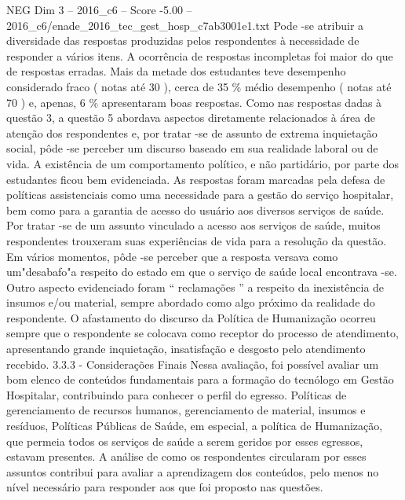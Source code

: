 \begin{textsample}{NEG Dim 3 – 2016\_c6 – Score -5.00 – 2016\_c6/enade\_2016\_tec\_gest\_hosp\_c7ab3001e1.txt}
Pode -se atribuir a diversidade das respostas produzidas pelos respondentes à necessidade de responder a vários itens.
A ocorrência de respostas incompletas foi maior do que de respostas erradas.
Mais da metade dos estudantes teve desempenho considerado fraco ( notas até 30 ), cerca de 35 \% médio desempenho ( notas até 70 ) e, apenas, 6 \% apresentaram boas respostas.
Como nas respostas dadas à questão 3, a questão 5 abordava aspectos diretamente relacionados à área de atenção dos respondentes e, por tratar -se de assunto de extrema inquietação social, pôde -se perceber um discurso baseado em sua realidade laboral ou de vida.
A existência de um comportamento político, e não partidário, por parte dos estudantes ficou bem evidenciada.
As respostas foram marcadas pela defesa de políticas assistenciais como uma necessidade para a gestão do serviço hospitalar, bem como para a garantia de acesso do usuário aos diversos serviços de saúde.
Por tratar -se de um assunto vinculado a acesso aos serviços de saúde, muitos respondentes trouxeram suas experiências de vida para a resolução da questão.
Em vários momentos, pôde -se perceber que a resposta versava como um"desabafo"a respeito do estado em que o serviço de saúde local encontrava -se.
Outro aspecto evidenciado foram “ reclamações ” a respeito da inexistência de insumos e/ou material, sempre abordado como algo próximo da realidade do respondente.
O afastamento do discurso da Política de Humanização ocorreu sempre que o respondente se colocava como receptor do processo de atendimento, apresentando grande inquietação, insatisfação e desgosto pelo atendimento recebido. 3.3.3 - Considerações Finais Nessa avaliação, foi possível avaliar um bom elenco de conteúdos fundamentais para a formação do tecnólogo em Gestão Hospitalar, contribuindo para conhecer o perfil do egresso.
Políticas de gerenciamento de recursos humanos, gerenciamento de material, insumos e resíduos, Políticas Públicas de Saúde, em especial, a política de Humanização, que permeia todos os serviços de saúde a serem geridos por esses egressos, estavam presentes.
A análise de como os respondentes circularam por esses assuntos contribui para avaliar a aprendizagem dos conteúdos, pelo menos no nível necessário para responder aos que foi proposto nas questões.

\end{textsample}
